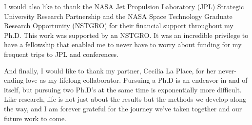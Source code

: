 I would also like to thank the NASA Jet Propulsion Laboratory (JPL) Strategic University Research Partnership and the NASA Space Technology Graduate Research Opportunity (NSTGRO) for their financial support throughout my Ph.D. 
This work was supported by an NSTGRO. 
It was an incredible privilege to have a fellowship that enabled me to never have to worry about funding for my frequent trips to JPL and conferences.

And finally, I would like to thank my partner, Cecilia La Place, for her never-ending love as my lifelong collaborator. 
Pursuing a Ph.D is an endeavor in and of itself, but pursuing two Ph.D's at the same time is exponentially more difficult.
Like research, life is not just about the results but the methods we develop along the way, and I am forever grateful for the journey we've taken together and our future work to come.
